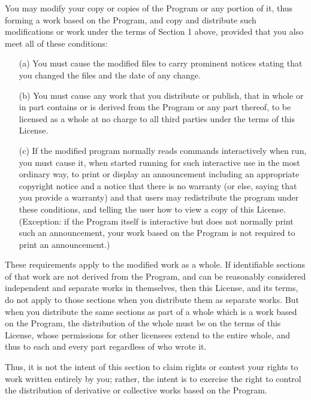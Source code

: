 \documentclass[%
	11pt,
        a4paper,
        twoside]{workrep}
\begin{document}
\gnuitem
You may modify your copy or copies of the Program or any portion
of it, thus forming a work based on the Program, and copy and
distribute such modifications or work under the terms of Section 1
above, provided that you also meet all of these conditions:
    \begin{itemize}
    \item[(a)] You must cause the modified files to carry prominent notices
    stating that you changed the files and the date of any change.

    \item[(b)] You must cause any work that you distribute or publish, that in
    whole or in part contains or is derived from the Program or any
    part thereof, to be licensed as a whole at no charge to all third
    parties under the terms of this License.

    \item[(c)] If the modified program normally reads commands interactively
    when run, you must cause it, when started running for such
    interactive use in the most ordinary way, to print or display an
    announcement including an appropriate copyright notice and a
    notice that there is no warranty (or else, saying that you provide
    a warranty) and that users may redistribute the program under
    these conditions, and telling the user how to view a copy of this
    License.  (Exception: if the Program itself is interactive but
    does not normally print such an announcement, your work based on
    the Program is not required to print an announcement.)
    \end{itemize}

These requirements apply to the modified work as a whole.  If
identifiable sections of that work are not derived from the Program,
and can be reasonably considered independent and separate works in
themselves, then this License, and its terms, do not apply to those
sections when you distribute them as separate works.  But when you
distribute the same sections as part of a whole which is a work based
on the Program, the distribution of the whole must be on the terms of
this License, whose permissions for other licensees extend to the
entire whole, and thus to each and every part regardless of who wrote it.

Thus, it is not the intent of this section to claim rights or contest
your rights to work written entirely by you; rather, the intent is to
exercise the right to control the distribution of derivative or
collective works based on the Program.
\end{document}
